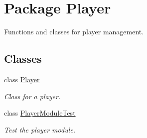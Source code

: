 \hypertarget{namespace_player}{
\section{Package Player}
\label{namespace_player}
}


Functions and classes for player management.  


\subsection*{Classes}
\begin{DoxyCompactItemize}
\item 
class \hyperlink{class_player_1_1_player}{Player}
\begin{DoxyCompactList}\small\item\em Class for a player. \item\end{DoxyCompactList}\item 
class \hyperlink{class_player_1_1_player_module_test}{PlayerModuleTest}
\begin{DoxyCompactList}\small\item\em Test the player module. \item\end{DoxyCompactList}\end{DoxyCompactItemize}
